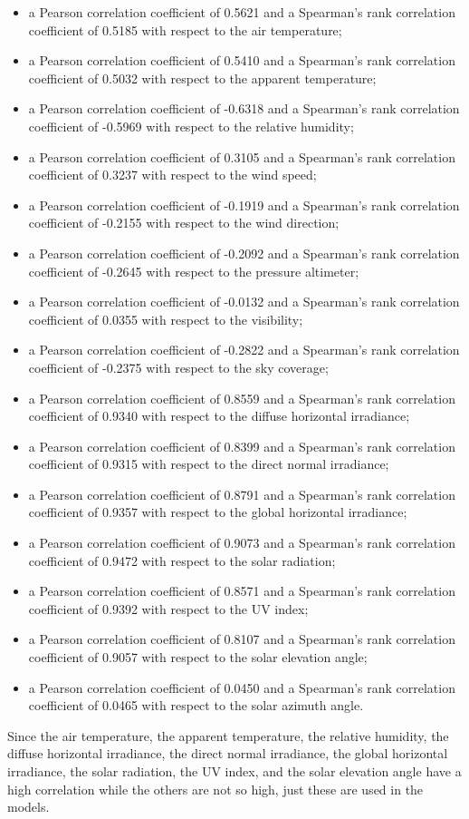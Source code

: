 \begin{itemize}
  \item a Pearson correlation coefficient of 0.5621 and a Spearman's rank correlation coefficient of 0.5185 with respect to the air temperature;
  \item a Pearson correlation coefficient of 0.5410 and a Spearman's rank correlation coefficient of 0.5032 with respect to the apparent temperature;
  \item a Pearson correlation coefficient of -0.6318 and a Spearman's rank correlation coefficient of -0.5969 with respect to the relative humidity;
  \item a Pearson correlation coefficient of 0.3105 and a Spearman's rank correlation coefficient of 0.3237 with respect to the wind speed;
  \item a Pearson correlation coefficient of -0.1919 and a Spearman's rank correlation coefficient of -0.2155 with respect to the wind direction;
  \item a Pearson correlation coefficient of -0.2092 and a Spearman's rank correlation coefficient of -0.2645 with respect to the pressure altimeter;
  \item a Pearson correlation coefficient of -0.0132 and a Spearman's rank correlation coefficient of 0.0355 with respect to the visibility;
  \item a Pearson correlation coefficient of -0.2822 and a Spearman's rank correlation coefficient of -0.2375 with respect to the sky coverage;
  \item a Pearson correlation coefficient of 0.8559 and a Spearman's rank correlation coefficient of 0.9340 with respect to the diffuse horizontal irradiance;
  \item a Pearson correlation coefficient of 0.8399 and a Spearman's rank correlation coefficient of 0.9315 with respect to the direct normal irradiance;
  \item a Pearson correlation coefficient of 0.8791 and a Spearman's rank correlation coefficient of 0.9357 with respect to the global horizontal irradiance;
  \item a Pearson correlation coefficient of 0.9073 and a Spearman's rank correlation coefficient of 0.9472 with respect to the solar radiation;
  \item a Pearson correlation coefficient of 0.8571 and a Spearman's rank correlation coefficient of 0.9392 with respect to the UV index;
  \item a Pearson correlation coefficient of 0.8107 and a Spearman's rank correlation coefficient of 0.9057 with respect to the solar elevation angle;
  \item a Pearson correlation coefficient of 0.0450 and a Spearman's rank correlation coefficient of 0.0465 with respect to the solar azimuth angle.
\end{itemize}
Since the air temperature, the apparent temperature, the relative humidity, the diffuse horizontal irradiance, the direct normal irradiance, the global horizontal irradiance, the solar radiation, the UV index, and the solar elevation angle have a high correlation while the others are not so high, just these are used in the models.  %

